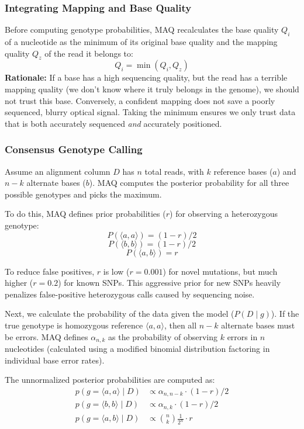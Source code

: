 \subsubsection{Integrating Mapping and Base Quality}
Before computing genotype probabilities, MAQ recalculates the base quality $Q_i$ of a nucleotide as the minimum of its original base quality and the mapping quality $Q_z$ of the read it belongs to:
\begin{equation}
    Q_i = \min(Q_i, Q_z)
\end{equation}
\textbf{Rationale:} If a base has a high sequencing quality, but the read has a terrible mapping quality (we don't know where it truly belongs in the genome), we should not trust this base. Conversely, a confident mapping does not save a poorly sequenced, blurry optical signal. Taking the minimum ensures we only trust data that is both accurately sequenced \textit{and} accurately positioned.

\subsubsection{Consensus Genotype Calling}
Assume an alignment column $D$ has $n$ total reads, with $k$ reference bases ($a$) and $n-k$ alternate bases ($b$). MAQ computes the posterior probability for all three possible genotypes and picks the maximum.

To do this, MAQ defines prior probabilities ($r$) for observing a heterozygous genotype:
\[ P(\langle a, a \rangle) = (1 - r) / 2 \]
\[ P(\langle b, b \rangle) = (1 - r) / 2 \]
\[ P(\langle a, b \rangle) = r \]

To reduce false positives, $r$ is low ($r = 0.001$) for novel mutations, but much higher ($r = 0.2$) for known SNPs. \sta This aggressive prior for new SNPs heavily penalizes false-positive heterozygous calls caused by sequencing noise.

Next, we calculate the probability of the data given the model ($P(D \mid g)$). 
If the true genotype is homozygous reference $\langle a,a \rangle$, then all $n-k$ alternate bases must be errors. MAQ defines $\alpha_{n,k}$ as the probability of observing $k$ errors in $n$ nucleotides (calculated using a modified binomial distribution factoring in individual base error rates).

The unnormalized posterior probabilities are computed as:
\begin{align}
p(g = \langle a, a \rangle \mid D) &\propto \alpha_{n, n - k} \cdot (1 - r) / 2 \\
p(g = \langle b, b \rangle \mid D) &\propto \alpha_{n, k} \cdot (1 - r) / 2 \\
p(g = \langle a, b \rangle \mid D) &\propto \binom{n}{k} \frac{1}{2^n} \cdot r
\end{align}

